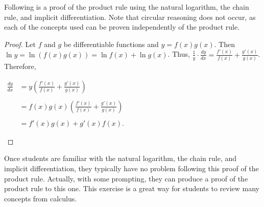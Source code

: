 \documentclass[12pt]{article}
\begin{document}
Following is a proof of the product rule using the natural logarithm, the chain rule, and implicit differentiation.  Note that circular reasoning does not occur, as each of the concepts used can be proven independently of the product rule.

\begin{proof}
Let $f$ and $g$ be differentiable functions and $y=f(x)g(x)$.  Then $\ln y=\ln (f(x)g(x))=\ln f(x)+\ln g(x)$.  Thus, $\displaystyle \frac{1}{y} \cdot \frac{dy}{dx}=\frac{f'(x)}{f(x)}+\frac{g'(x)}{g(x)}$.  Therefore,

\begin{center}
$\begin{array}{rl}
\displaystyle \frac{dy}{dx} & \displaystyle = y \left( \frac{f'(x)}{f(x)}+\frac{g'(x)}{g(x)} \right) \\
& \\
& \displaystyle = f(x)g(x) \left( \frac{f'(x)}{f(x)}+\frac{g'(x)}{g(x)} \right) \\
& \\
& = f'(x)g(x)+g'(x)f(x). \end{array}$
\end{center}
\end{proof}

Once students are familiar with the natural logarithm, the chain rule, and implicit differentiation, they typically have no problem following this proof of the product rule.  Actually, with some prompting, they can produce a proof of the product rule  to this one.  This exercise is a great way for students to review many concepts from calculus.
\end{document}
